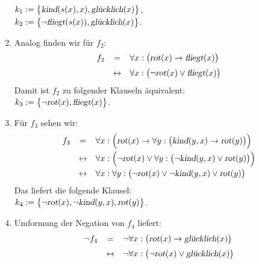 \begin{enumerate}
      \\[0.2cm]
      \hspace*{1.3cm} $k_1 := \bigl\{ \textsl{kind}(s(x),x), \textsl{gl\"{u}cklich}(x) \bigl\}$,   \\[0.2cm]
      \hspace*{1.3cm} $k_2 := \bigl\{ \neg \textsl{fliegt}(s(x)), \textsl{gl\"{u}cklich}(x) \bigl\}$. 
\item Analog finden wir f\"{u}r $f_2$:
 $$
        \begin{array}{lcl}
            f_2 & =  & \forall x: \bigl(\textsl{rot}(x) \rightarrow \textsl{fliegt}(x) \bigr) \\[0.2cm]
            & \leftrightarrow  & \forall x: \bigl(\neg \textsl{rot}(x) \vee \textsl{fliegt}(x) \bigr)
        \end{array}
      $$ 
      Damit ist $f_2$ zu folgender Klauseln \"{a}quivalent: \\[0.2cm]
      \hspace*{1.3cm} $k_3 := \bigl\{ \neg \textsl{rot}(x), \textsl{fliegt}(x) \bigl\}$.
\item F\"{u}r $f_3$ sehen wir:
 $$
        \begin{array}{lcl}
          f_3 & =          & \forall x: \Bigl(\textsl{rot}(x) \rightarrow 
                             \forall y: \bigl(\textsl{kind}(y,x) \rightarrow \textsl{rot}(y)\bigr) \Bigr) 
          \\[0.2cm]
          &\leftrightarrow & \forall x: \Bigl(\neg \textsl{rot}(x) \vee 
                             \forall y: \bigl(\neg \textsl{kind}(y,x) \vee \textsl{rot}(y)\bigr)\Bigr) 
          \\[0.2cm]
          &\leftrightarrow & \forall x: \forall y: \bigl(\neg \textsl{rot}(x) \vee \neg \textsl{kind}(y,x) \vee \textsl{rot}(y)\bigr)
        \end{array}
      $$
     Das liefert die folgende Klausel: \\[0.2cm]
     \hspace*{1.3cm} $ k_4 := \bigl\{ \neg \textsl{rot}(x), \neg \textsl{kind}(y,x), \textsl{rot}(y)\bigl\}$.
\item Umformung der Negation von $f_4$ liefert:
 $$
        \begin{array}{lcl}
\neg f_4 & =      & \neg \forall x: \bigl(\textsl{rot}(x) \rightarrow \textsl{gl\"{u}cklich}(x)\bigr) 
         \\[0.2cm]
         & \leftrightarrow & \neg \forall x: \bigl(\neg \textsl{rot}(x) \vee \textsl{gl\"{u}cklich}(x) \bigr)
         \\[0.2cm]

\end{array}$$
\end{enumerate}
